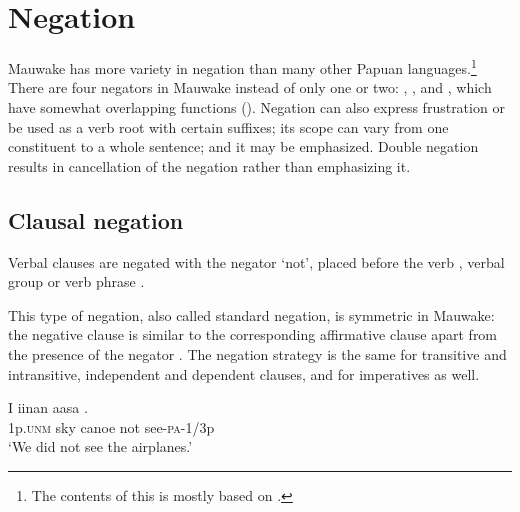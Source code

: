 \section{Negation}\label{sec:6.2} 


Mauwake has more variety in negation than many other Papuan languages.\footnote{The contents of this  is mostly based on \citet{Berghall2006}.}
%
%
%
%
There are four negators in Mauwake instead of only one or two: , ,  and , which have somewhat overlapping functions (). Negation can also express frustration or be used as a verb root with certain suffixes; its scope can vary from one constituent to a whole sentence; and it may be emphasized. Double negation results in cancellation of the negation rather than emphasizing it. 

\subsection{Clausal negation} \label{sec:6.2.1}

Verbal clauses are negated with the negator  `not', placed before the verb , verbal group  or verb phrase . 

This type of negation, also called standard negation, is symmetric in Mauwake: the negative clause is similar to the corresponding affirmative clause apart from the presence of the negator \citep[61--67]{Miestamo2005}. The negation strategy is the same for transitive and intransitive, independent and dependent clauses, and for imperatives  as well. 

\ea%
\label{ex:6:x1090}
\gll I  iinan  aasa    . \\
1p.\textsc{unm}  sky  canoe  not  see-\textsc{pa}-1/3p\\
\glt `We did not see the airplanes.'
\z

